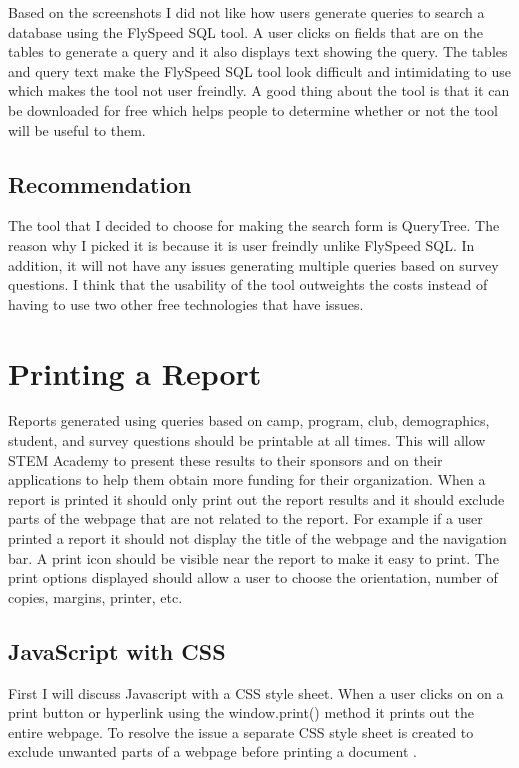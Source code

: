 \documentclass[letterpaper,10pt,serif, draftclsnofoot,onecolumn, compsoc, titlepage]{IEEEtran}
\begin{document}
Based on the screenshots I did not like how users generate queries to search a database using the FlySpeed SQL tool. A user clicks on fields that are on the tables to generate a query and it also displays text showing the query. The tables and query text make the FlySpeed SQL tool look difficult and intimidating to use which makes the tool not user freindly. A good thing about the tool is that it can be downloaded for free which helps people to determine whether or not the tool will be useful to them. 

\subsection{Recommendation} 
The tool that I decided to choose for making the search form is QueryTree. The reason why I picked it is because it is user freindly unlike FlySpeed SQL. In addition, it will not have any issues generating multiple queries based on survey questions. I think that the usability of the tool outweights the costs instead of having to use two other free technologies that have issues. 

\section{Printing a Report}
Reports generated using queries based on camp, program, club, demographics, student, and survey questions should be printable at all times. This will allow STEM Academy to present these results to their sponsors and on their applications to help them obtain more funding for their organization. When a report is printed it should only print out the report results and it should exclude parts of the webpage that are not related to the report. For example if a user printed a report it should not display the title of the webpage and the navigation bar. A print icon should be visible near the report to make it easy to print. The print options displayed should allow a user to choose the orientation, number of copies, margins, printer, etc. 

\subsection{JavaScript with CSS}
First I will discuss Javascript with a CSS style sheet. When a user clicks on on a print button or hyperlink using the window.print() method it prints out the entire webpage\cite{Javascript}. To resolve the issue a separate CSS style sheet is created to exclude unwanted parts of a webpage before printing a document \cite{Javascript}. 
\end{document}
